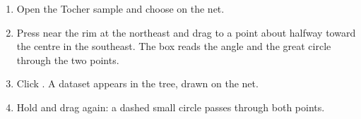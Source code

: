 \begin{tryit}
\begin{enumerate}
\item Open the Tocher sample and choose  on the net.
\item Press near the rim at the northeast and drag to a point about halfway toward the centre in the
southeast. The box reads the angle and the great circle through the two points.
\item Click . A dataset  appears in the tree, drawn on the net.
\item Hold  and drag again: a dashed small circle passes through both points.
\end{enumerate}
\end{tryit}
